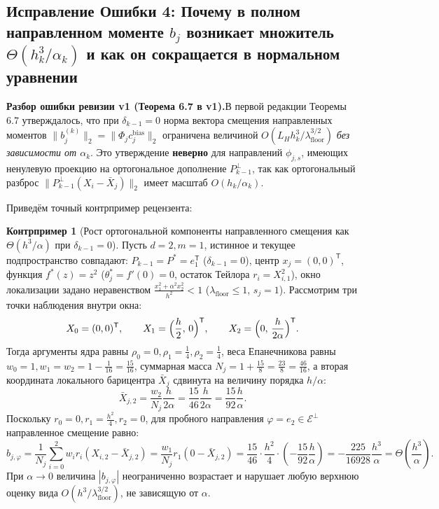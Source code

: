 \documentclass[11pt,a4paper]{article}
\newcommand{\T}{^{\mathsf{T}}}
\newcommand{\PEDRs}{P^{*}}
\theoremstyle{definition}
\newtheorem{counterexample}[theorem]{Контрпример}
\theoremstyle{remark}
\newcommand{\auditbox}[2]{%
  \vspace{6pt}\noindent\colorbox{warnbg}{%
    \parbox{\dimexpr\textwidth-2\fboxsep\relax}{%
      \vspace{4pt}\textbf{\color{accent}#1.}\hspace{0.4em}#2\vspace{4pt}%
    }%
  }\vspace{6pt}%
}
\begin{document}
\subsection{Исправление Ошибки 4: Почему в полном направленном моменте $b_j$ возникает множитель $\Theta(h_k^3/\alpha_k)$ и как он сокращается в нормальном уравнении}

\auditbox{Разбор ошибки ревизии v1 (Теорема 6.7 в v1)}{В первой редакции Теоремы 6.7 утверждалось, что при $\delta_{k-1} = 0$ норма вектора смещения направленных моментов $\|b_j^{(k)}\|_2 = \|\Phi_j c_j^{\mathrm{bias}}\|_2$ ограничена величиной $O(L_H h_k^3 / \lambda_{\mathrm{floor}}^{3/2})$ \emph{без зависимости от $\alpha_k$}. Это утверждение \textbf{неверно} для направлений $\phi_{j,s}$, имеющих ненулевую проекцию на ортогональное дополнение $P_{k-1}^\perp$, так как ортогональный разброс $\|P_{k-1}^\perp(X_i - \bar{X}_j)\|_2$ имеет масштаб $O(h_k / \alpha_k)$.}

Приведём точный контрпример рецензента:

\begin{counterexample}[Рост ортогональной компоненты направленного смещения как $\Theta(h^3/\alpha)$ при $\delta_{k-1}=0$]\label{cex:ortho_bias_alpha}
Пусть $d = 2, m = 1$, истинное и текущее подпространство совпадают: $P_{k-1} = \PEDRs = e_1\T$ ($\delta_{k-1} = 0$), центр $x_j = (0,0)\T$, функция $f^*(z) = z^2$ ($\theta^*_j = f'(0) = 0$, остаток Тейлора $r_i = X_{i,1}^2$), окно локализации задано неравенством $\frac{x_1^2 + \alpha^2 x_2^2}{h^2} < 1$ ($\lambda_{\mathrm{floor}} \le 1$, $s_j = 1$). Рассмотрим три точки наблюдения внутри окна:
\[
    X_0 = (0, 0)\T, \qquad X_1 = \Bigl(\frac{h}{2}, \, 0\Bigr)\T, \qquad X_2 = \Bigl(0, \, \frac{h}{2\alpha}\Bigr)\T.
\]
Тогда аргументы ядра равны $\rho_0 = 0, \rho_1 = \frac{1}{4}, \rho_2 = \frac{1}{4}$, веса Епанечникова равны $w_0 = 1, w_1 = w_2 = 1 - \frac{1}{16} = \frac{15}{16}$, суммарная масса $N_j = 1 + \frac{15}{8} = \frac{23}{8} = \frac{46}{16}$, а вторая координата локального барицентра $\bar{X}_j$ сдвинута на величину порядка $h/\alpha$:
\[
    \bar{X}_{j,2} = \frac{w_2}{N_j}\frac{h}{2\alpha} = \frac{15}{46}\frac{h}{2\alpha} = \frac{15}{92}\frac{h}{\alpha}.
\]
Поскольку $r_0 = 0, r_1 = \frac{h^2}{4}, r_2 = 0$, для пробного направления $\varphi = e_2 \in \mathcal{E}^\perp$ направленное смещение равно:
\begin{equation}\label{eq:cex_exact_fraction}
    b_{j,\varphi} = \frac{1}{N_j}\sum_{i=0}^2 w_i r_i (X_{i,2} - \bar{X}_{j,2}) = \frac{w_1}{N_j} r_1 (0 - \bar{X}_{j,2}) = \frac{15}{46}\cdot \frac{h^2}{4}\cdot\left(-\frac{15}{92}\frac{h}{\alpha}\right) = -\frac{225}{16928}\frac{h^3}{\alpha} = \Theta\left(\frac{h^3}{\alpha}\right).
\end{equation}
При $\alpha \to 0$ величина $|b_{j,\varphi}|$ неограниченно возрастает и нарушает любую верхнюю оценку вида $O(h^3 / \lambda_{\mathrm{floor}}^{3/2})$, не зависящую от $\alpha$.
\end{counterexample}
\end{document}
